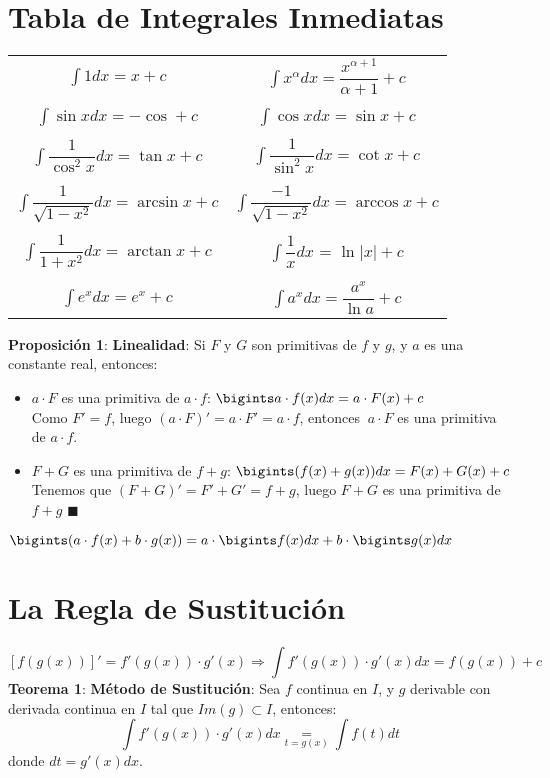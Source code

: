 \documentclass[11pt,a4paper]{article}
\newcommand*{\QEDA}{\null\nobreak\hfill\ensuremath{\blacksquare}}
\begin{document}
\section{Tabla de Integrales Inmediatas}
\begin{table}[h]
\centering
\begin{tabular}{cc}
$\int 1dx = x + c$ &
$\int x^\alpha dx = \dfrac{x^{\alpha+1}}{\alpha+1}+ c$ \\ \\
$\int \sin xdx = -\cos + c$ & 
$\int \cos x dx = \sin x + c$\\ \\
$\int \dfrac{1}{\cos^2 x} dx = \tan x + c$ & 
$\int \dfrac{1}{\sin^2 x} dx = \cot x + c$\\ \\
$\int \dfrac{1}{\sqrt{1 - x^2}} dx = \arcsin x + c$ & 
$\int \dfrac{-1}{\sqrt{1 - x^2}} dx = \arccos x + c$ \\ \\
$\int \dfrac{1}{1 + x^2} dx = \arctan x + c$ &
$\int \dfrac{1}{x} dx$ = $\ln|x| + c$ \\ \\
$\int e^xdx = e^x+c$ &
$\int a^xdx = \dfrac{a^x}{\ln a} + c$
\end{tabular}
\end{table}

\noindent \textbf{Proposici\'on 1}: \textbf{Linealidad}: Si $F$ y $G$ son primitivas de $f$ y $g$, y $a$ es una constante real, entonces:
\begin{itemize}
\item $a \cdot F$ es una primitiva de $a \cdot f$: $\bigints a \cdot f(x)dx = a \cdot F(x)+c$\\
Como $F' = f$, luego $(a\cdot F)'=a\cdot F' = a\cdot f$, entonces $\ a \cdot F$ es una primitiva de $a \cdot f$.
\item $F + G$ es una primitiva de $f+g$: $\bigints (f(x)+g(x))dx = F(x)+G(x)+c$\\
Tenemos que $(F+G)' = F'+G' = f+g$, luego $F+G$ es una primitiva de $f+g$ \QEDA\\
\end{itemize}
\begin{center}
$\bigints(a \cdot f(x) + b \cdot g(x)) = a \cdot \bigints f(x) dx + b \cdot \bigints g(x) dx$
\end{center}

\section{La Regla de Sustituci\'on}
$$\left[ f(g(x)) \right]' = f'(g(x)) \cdot g'(x) \Rightarrow \int f'(g(x)) \cdot g'(x) dx = f(g(x))+c $$
\textbf{Teorema 1}: \textbf{M\'etodo de Sustituci\'on}: Sea $f$ continua en $I$, y $g$ derivable con derivada continua en $I$ tal que $Im(g) \subset I$, entonces: $$\int f'(g(x))\cdot g'(x) dx \underset{t=g(x)}{=} \int f(t)dt$$
donde $dt = g'(x)dx$.\\
\end{document}
